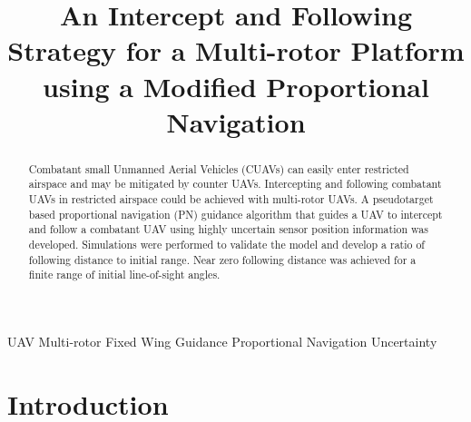 \documentclass[conference]{IEEEtran}
\begin{document}
\title{An Intercept and Following Strategy for a Multi-rotor Platform using a Modified Proportional Navigation}

\author{
\and
{}
}

\maketitle


\begin{abstract}
	Combatant small Unmanned Aerial Vehicles (CUAVs) can easily enter restricted airspace and may be mitigated by counter UAVs. Intercepting and following combatant UAVs in restricted airspace could be achieved with multi-rotor UAVs. A pseudotarget based proportional navigation (PN) guidance algorithm that guides a UAV to intercept and follow a combatant UAV using highly uncertain sensor position information was developed. Simulations were performed to validate the model and develop a ratio of following distance to initial range. Near zero following distance was achieved for a finite range of initial line-of-sight angles.
\end{abstract}

\begin{IEEEkeywords}
	UAV
	Multi-rotor
	Fixed Wing
	Guidance
	Proportional Navigation
	Uncertainty

\end{IEEEkeywords}

\section{Introduction}
\end{document}
